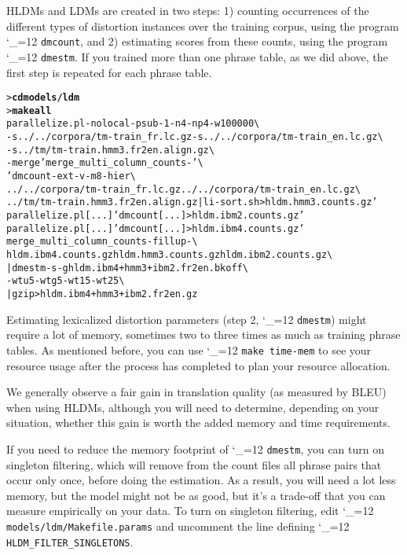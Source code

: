 \documentclass[11pt,letterpaper]{article}
\newcommand{\bs}{\textbackslash{}}
\def\code{\begingroup\catcode`\_=12 \codex}
\newcommand{\codex}[1]{\texttt{#1}\endgroup}
\begin{document}
HLDMs and LDMs are created in two steps: 1) counting occurrences of the
different types of distortion instances over the training corpus, using the
program \code{dmcount}, and 2) estimating scores from these counts, using the
program \code{dmestm}.  If you trained more than one phrase table, as we did
above, the first step is repeated for each phrase table.
\begin{small}
\begin{alltt}
   > \textbf{cd models/ldm}
   > \textbf{make all}
   parallelize.pl -nolocal -psub -1 -n 4 -np 4 -w 100000 \bs
      -s ../../corpora/tm-train_fr.lc.gz -s ../../corpora/tm-train_en.lc.gz \bs
      -s ../tm/tm-train.hmm3.fr2en.align.gz \bs
      -merge 'merge_multi_column_counts -' \bs
      'dmcount -ext -v -m 8 -hier \bs
         ../../corpora/tm-train_fr.lc.gz ../../corpora/tm-train_en.lc.gz \bs
         ../tm/tm-train.hmm3.fr2en.align.gz | li-sort.sh > hldm.hmm3.counts.gz'
   parallelize.pl [...] 'dmcount [...] > hldm.ibm2.counts.gz'
   parallelize.pl [...] 'dmcount [...] > hldm.ibm4.counts.gz'
   merge_multi_column_counts -fillup - \bs
      hldm.ibm4.counts.gz hldm.hmm3.counts.gz hldm.ibm2.counts.gz \bs
      | dmestm -s -g hldm.ibm4+hmm3+ibm2.fr2en.bkoff \bs
        -wtu 5 -wtg 5 -wt1 5 -wt2 5 \bs
      | gzip > hldm.ibm4+hmm3+ibm2.fr2en.gz
\end{alltt}
\end{small}

Estimating lexicalized distortion parameters (step 2, \code{dmestm}) might
require a lot of memory, sometimes two to three times as much as training
phrase tables.  As mentioned before, you can use \code{make time-mem} to see
your resource usage after the process has completed to plan your resource
allocation.

We generally observe a fair gain in translation quality (as measured by BLEU)
when using HLDMs, although you will need to determine, depending on your
situation, whether this gain is worth the added memory and time requirements.

If you need to reduce the memory footprint of \code{dmestm}, you can turn on
singleton filtering, which will remove from the count files all phrase pairs
that occur only once, before doing the estimation.  As a result, you will need
a lot less memory, but the model might not be as good, but it's a trade-off that
you can measure empirically on your data.  To turn on singleton filtering, edit
\code{models/ldm/Makefile.params} and uncomment the line defining
\code{HLDM_FILTER_SINGLETONS}.
\end{document}
